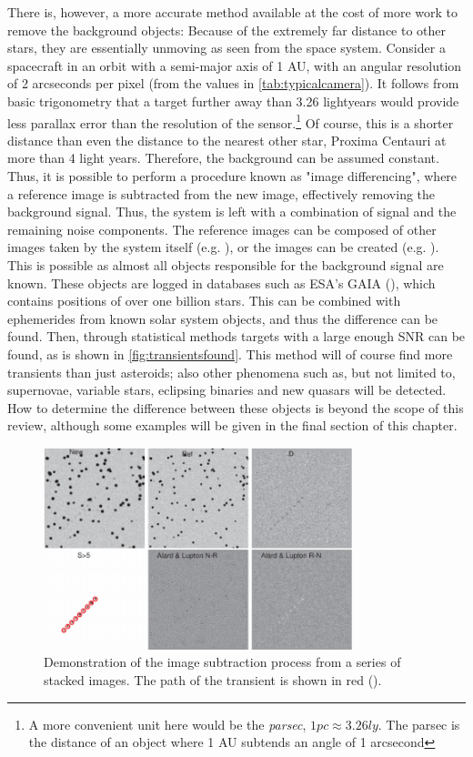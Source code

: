 There is, however, a more accurate method available at the cost of more work to remove the background objects: Because of the extremely far distance to other stars, they are essentially unmoving as seen from the space system. Consider a spacecraft in an orbit with a semi-major axis of 1 AU, with an angular resolution of 2 arcseconds per pixel (from the values in \autoref{tab:typicalcamera}). It follows from basic trigonometry that a target further away than 3.26 lightyears would provide less parallax error than the resolution of the sensor.\footnote{A more convenient unit here would be the \textit{parsec}, $1pc \approx 3.26ly$. The parsec is the distance of an object where 1 AU subtends an angle of 1 arcsecond} Of course, this is a shorter distance than even the distance to the nearest other star, Proxima Centauri at more than 4 light years. Therefore, the background can be assumed constant. Thus, it is possible to perform a procedure known as "image differencing", where a reference image is subtracted from the new image, effectively removing the background signal. Thus, the system is left with a combination of signal and the remaining noise components. The reference images can be composed of other images taken by the system itself (e.g. \cite{subtraction}), or the images can be created (e.g. \cite{PalomarPipeline}). This is possible as almost all objects responsible for the background signal are known. These objects are logged in databases such as ESA's GAIA (\cite{GAIA}), which contains positions of over one billion stars. This can be combined with ephemerides from known solar system objects, and thus the difference can be found. Then, through statistical methods targets with a large enough SNR can be found, as is shown in \autoref{fig:transientsfound}. This method will of course find more transients than just asteroids; also other phenomena such as, but not limited to, supernovae, variable stars, eclipsing binaries and new quasars will be detected. How to determine the difference between these objects is beyond the scope of this review, although some examples will be given in the final section of this chapter.

\begin{figure}[htbp]
    \centering
    \includegraphics[width=0.8\textwidth]{images/transients.png}
    \caption{Demonstration of the image subtraction process from a series of stacked images. The path of the transient is shown in red (\cite{processingclassic}).}
    \label{fig:transientsfound}
\end{figure}

